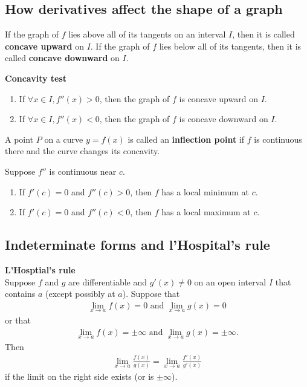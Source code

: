 \documentclass{article}
\begin{document}
\subsection{How derivatives affect the shape of a graph}
\begin{definition}
	If the graph of $f$ lies above all of its tangents on an interval $I$, then it is called \textbf{concave upward} on $I$. If the graph of $f$ lies below all of its tangents, then it is called \textbf{concave downward} on $I$.
\end{definition}
\begin{theorem}
	\textbf{Concavity test}
	\begin{enumerate}
		\item If $\forall x\in I, f''(x)>0$, then the graph of $f$ is concave upward on $I$.
		\item If $\forall x\in I, f''(x)<0$, then the graph of $f$ is concave downward on $I$.
	\end{enumerate}
\end{theorem}
\begin{definition}
	A point $P$ on a curve $y=f(x)$ is called an \textbf{inflection point} if $f$ is continuous there and the curve changes its concavity.
\end{definition}
\begin{theorem}
	Suppose $f''$ is continuous near $c$.
	\begin{enumerate}
		\item If $f'(c)=0$ and $f''(c)>0$, then $f$ has a local minimum at $c$.
		\item If $f'(c)=0$ and $f''(c)<0$, then $f$ has a local maximum at $c$.
	\end{enumerate}
\end{theorem}
\subsection{Indeterminate forms and l'Hospital's rule}
\begin{theorem}
	\textbf{L'Hosptial's rule}\\
	Suppose $f$ and $g$ are differentiable and $g'(x)\not=0$ on an open interval $I$ that contains $a$ (except possibly at $a$). Suppose that
	\begin{align*}
		\lim_{x\to a}f(x)=0\text{ and } \lim_{x\to a}g(x)=0
	\end{align*}
	or that
	\begin{align*}
		\lim_{x\to a}f(x)=\pm\infty \text{ and } \lim_{x\to a}g(x) = \pm\infty.
	\end{align*}
	Then
	\begin{align*}
		\lim_{x\to a}\frac{f(x)}{g(x)}=\lim_{x\to a}\frac{f'(x)}{g'(x)}
	\end{align*}
	if the limit on the right side exists (or is $\pm\infty$).
\end{theorem}
\setcounter{subsection}{6}
\end{document}
